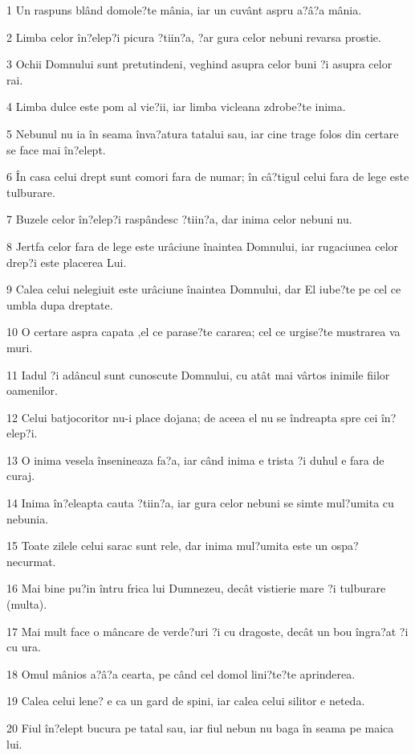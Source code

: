 \par 1 Un raspuns blând domole?te mânia, iar un cuvânt aspru a?â?a mânia.
\par 2 Limba celor în?elep?i picura ?tiin?a, ?ar gura celor nebuni revarsa prostie.
\par 3 Ochii Domnului sunt pretutindeni, veghind asupra celor buni ?i asupra celor rai.
\par 4 Limba dulce este pom al vie?ii, iar limba vicleana zdrobe?te inima.
\par 5 Nebunul nu ia în seama înva?atura tatalui sau, iar cine trage folos din certare se face mai în?elept.
\par 6 În casa celui drept sunt comori fara de numar; în câ?tigul celui fara de lege este tulburare.
\par 7 Buzele celor în?elep?i raspândesc ?tiin?a, dar inima celor nebuni nu.
\par 8 Jertfa celor fara de lege este urâciune înaintea Domnului, iar rugaciunea celor drep?i este placerea Lui.
\par 9 Calea celui nelegiuit este urâciune înaintea Domnului, dar El iube?te pe cel ce umbla dupa dreptate.
\par 10 O certare aspra capata ,el ce parase?te cararea; cel ce urgise?te mustrarea va muri.
\par 11 Iadul ?i adâncul sunt cunoscute Domnului, cu atât mai vârtos inimile fiilor oamenilor.
\par 12 Celui batjocoritor nu-i place dojana; de aceea el nu se îndreapta spre cei în?elep?i.
\par 13 O inima vesela însenineaza fa?a, iar când inima e trista ?i duhul e fara de curaj.
\par 14 Inima în?eleapta cauta ?tiin?a, iar gura celor nebuni se simte mul?umita cu nebunia.
\par 15 Toate zilele celui sarac sunt rele, dar inima mul?umita este un ospa? necurmat.
\par 16 Mai bine pu?in întru frica lui Dumnezeu, decât vistierie mare ?i tulburare (multa).
\par 17 Mai mult face o mâncare de verde?uri ?i cu dragoste, decât un bou îngra?at ?i cu ura.
\par 18 Omul mânios a?â?a cearta, pe când cel domol lini?te?te aprinderea.
\par 19 Calea celui lene? e ca un gard de spini, iar calea celui silitor e neteda.
\par 20 Fiul în?elept bucura pe tatal sau, iar fiul nebun nu baga în seama pe maica lui.
